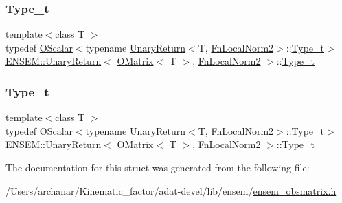 \subsubsection{\texorpdfstring{Type\_t}{Type\_t}\hspace{0.1cm}{\footnotesize\ttfamily [2/3]}}
{\footnotesize\ttfamily template$<$class T $>$ \\
typedef \mbox{\hyperlink{classENSEM_1_1OScalar}{O\+Scalar}}$<$typename \mbox{\hyperlink{structENSEM_1_1UnaryReturn}{Unary\+Return}}$<$T, \mbox{\hyperlink{structENSEM_1_1FnLocalNorm2}{Fn\+Local\+Norm2}}$>$\+::\mbox{\hyperlink{structENSEM_1_1UnaryReturn_3_01OMatrix_3_01T_01_4_00_01FnLocalNorm2_01_4_a9961e369c46fba05c0388f2ac5bef1ca}{Type\+\_\+t}}$>$ \mbox{\hyperlink{structENSEM_1_1UnaryReturn}{E\+N\+S\+E\+M\+::\+Unary\+Return}}$<$ \mbox{\hyperlink{classENSEM_1_1OMatrix}{O\+Matrix}}$<$ T $>$, \mbox{\hyperlink{structENSEM_1_1FnLocalNorm2}{Fn\+Local\+Norm2}} $>$\+::\mbox{\hyperlink{structENSEM_1_1UnaryReturn_3_01OMatrix_3_01T_01_4_00_01FnLocalNorm2_01_4_a9961e369c46fba05c0388f2ac5bef1ca}{Type\+\_\+t}}}

\mbox{\label{structENSEM_1_1UnaryReturn_3_01OMatrix_3_01T_01_4_00_01FnLocalNorm2_01_4_a9961e369c46fba05c0388f2ac5bef1ca}} 
\subsubsection{\texorpdfstring{Type\_t}{Type\_t}\hspace{0.1cm}{\footnotesize\ttfamily [3/3]}}
{\footnotesize\ttfamily template$<$class T $>$ \\
typedef \mbox{\hyperlink{classENSEM_1_1OScalar}{O\+Scalar}}$<$typename \mbox{\hyperlink{structENSEM_1_1UnaryReturn}{Unary\+Return}}$<$T, \mbox{\hyperlink{structENSEM_1_1FnLocalNorm2}{Fn\+Local\+Norm2}}$>$\+::\mbox{\hyperlink{structENSEM_1_1UnaryReturn_3_01OMatrix_3_01T_01_4_00_01FnLocalNorm2_01_4_a9961e369c46fba05c0388f2ac5bef1ca}{Type\+\_\+t}}$>$ \mbox{\hyperlink{structENSEM_1_1UnaryReturn}{E\+N\+S\+E\+M\+::\+Unary\+Return}}$<$ \mbox{\hyperlink{classENSEM_1_1OMatrix}{O\+Matrix}}$<$ T $>$, \mbox{\hyperlink{structENSEM_1_1FnLocalNorm2}{Fn\+Local\+Norm2}} $>$\+::\mbox{\hyperlink{structENSEM_1_1UnaryReturn_3_01OMatrix_3_01T_01_4_00_01FnLocalNorm2_01_4_a9961e369c46fba05c0388f2ac5bef1ca}{Type\+\_\+t}}}



The documentation for this struct was generated from the following file\+:\begin{DoxyCompactItemize}
\item 
/\+Users/archanar/\+Kinematic\+\_\+factor/adat-\/devel/lib/ensem/\mbox{\hyperlink{adat-devel_2lib_2ensem_2ensem__obsmatrix_8h}{ensem\+\_\+obsmatrix.\+h}}\end{DoxyCompactItemize}
